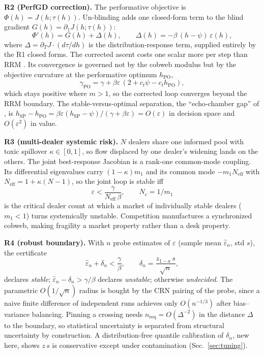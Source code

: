 \documentclass[sigconf]{acmart}
\newcommand{\eps}{\varepsilon}
\newcommand{\Neff}{N_{\mathrm{eff}}}
\newcommand{\hSP}{h_{\mathrm{SP}}}
\newcommand{\hPO}{h_{\mathrm{PO}}}
\newcommand{\gPO}{\gamma_{\mathrm{PO}}}
\begin{document}
\textbf{R2 (PerfGD correction).} The performative objective is
$\Phi(h)=J(h;\tau(h))$. Un-blinding adds one closed-form term to the blind
gradient $G(h)=\partial_1 J(h;\tau(h))$:
\begin{equation}
\Phi'(h)=G(h)+\Delta(h),\qquad
\Delta(h)=-\beta\,(h-\psi)\,\eps(h),
\label{eq:perfgd}
\end{equation}
where $\Delta=\partial_T J\cdot(d\tau/dh)$ is the distribution-response
term, supplied entirely by the R1 closed forms. The corrected ascent costs
one scalar more per step than RRM \cite{izzo2021learn}. Its convergence is
governed not by the cobweb modulus but by the objective curvature at the
performative optimum $\hPO$,
\begin{equation}
\gPO=\gamma+\beta\eps\,(2+c_t\psi-c_t\hPO),
\label{eq:gpo}
\end{equation}
which stays positive where $m>1$, so the corrected loop converges beyond the
RRM boundary. The stable-versus-optimal separation, the ``echo-chamber
gap'' of \cite{miller2021echo}, is
$\hSP-\hPO=\beta\eps(\hSP-\psi)/(\gamma+\beta\eps)=O(\eps)$ in decision
space and $O(\eps^2)$ in value.

\textbf{R3 (multi-dealer systemic risk).} $N$ dealers share one informed
pool with toxic spillover $\kappa\in[0,1]$, so flow displaced by one
dealer's widening lands on the others. The joint best-response Jacobian is a
rank-one common-mode coupling. Its differential eigenvalues carry
$(1-\kappa)m_1$ and its common mode $-m_1\Neff$ with
$\Neff=1+\kappa(N-1)$, so the joint loop is stable iff
\begin{equation}
\eps<\frac{\gamma}{\Neff\,\beta},
\qquad
N_c=1/m_1
\label{eq:multidealer}
\end{equation}
is the critical dealer count at which a market of individually stable
dealers ($m_1<1$) turns systemically unstable. Competition manufactures a
synchronized cobweb, making fragility a market property rather than a desk
property.

\textbf{R4 (robust boundary).} With $n$ probe estimates of $\eps$ (sample
mean $\hat\eps_n$, std $s$), the certificate
\begin{equation}
\hat\eps_n+\delta_n<\frac{\gamma}{\beta},\qquad
\delta_n=\frac{z_{1-a}\,s}{\sqrt{n}},
\label{eq:robust}
\end{equation}
declares \emph{stable}; $\hat\eps_n-\delta_n>\gamma/\beta$ declares
\emph{unstable}; otherwise \emph{undecided}. The parametric $O(1/\sqrt{n})$
radius is bought by the CRN pairing of the probe, since a naive finite
difference of independent runs achieves only $O(n^{-1/3})$ after
bias--variance balancing. Pinning a crossing needs
$n_{\mathrm{req}}=O(\Delta^{-2})$ in the distance $\Delta$ to the boundary,
so statistical uncertainty is separated from structural uncertainty by
construction. A distribution-free quantile calibration of $\delta_n$, new
here, shows $z\,s$ is conservative except under contamination
(Sec.~\ref{sec:tuning}).
\end{document}
